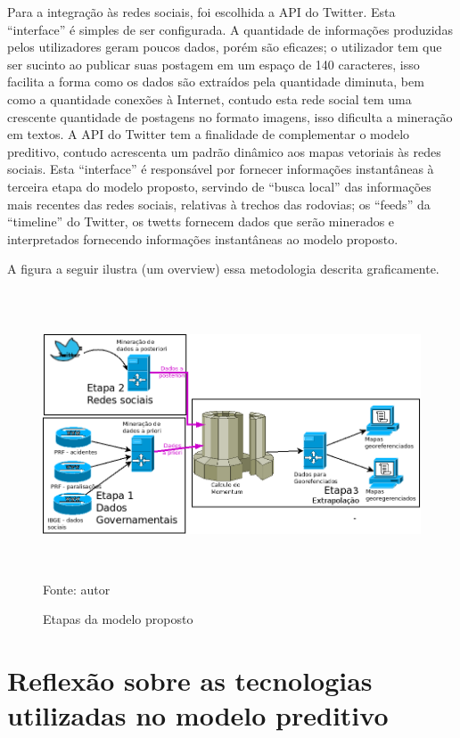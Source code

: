Para a integração às redes sociais, foi escolhida a API do Twitter. Esta ``interface'' é simples de ser configurada. A quantidade de informações produzidas pelos utilizadores geram poucos dados, porém são eficazes; o utilizador tem que ser sucinto ao publicar suas postagem em um espaço de 140 caracteres, isso facilita a forma como os dados são extraídos pela quantidade diminuta, bem como a quantidade conexões à Internet, contudo esta rede social tem uma crescente quantidade de postagens no formato imagens, isso dificulta a mineração em textos.
A API do Twitter tem a finalidade de complementar o modelo preditivo, contudo acrescenta um padrão dinâmico aos mapas vetoriais às redes sociais. 
Esta ``interface'' é responsável por fornecer informações instantâneas à terceira etapa do modelo proposto, servindo de ``busca local'' das informações mais recentes das redes sociais, relativas à trechos das rodovias; os ``feeds'' da ``timeline'' do Twitter, os twetts fornecem dados que serão minerados e interpretados fornecendo informações instantâneas ao modelo proposto.

A figura a seguir ilustra (um overview) essa metodologia descrita graficamente.

\pagebreak

\begin{figure}[ht]
\centering
\caption{Etapas da modelo proposto}
\includegraphics[width=170mm, height=85mm]{Figuras/Metodologia/metodologiaGeral.png}\\
\tiny Fonte: autor
\end{figure}

\section{Reflexão sobre as tecnologias utilizadas no modelo preditivo}\label{result}

